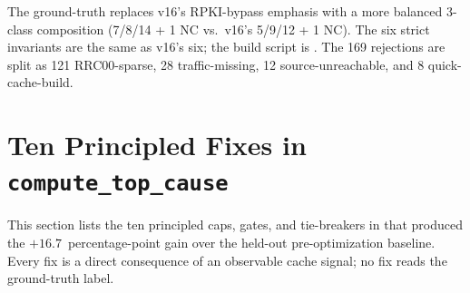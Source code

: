 \documentclass[sigcomm,nonatbib]{acmart}
\begin{document}
The ground-truth replaces v16's RPKI-bypass
emphasis with a more balanced 3-class composition
(7/8/14 + 1 NC vs.\ v16's 5/9/12 + 1 NC). The six
strict invariants are the same as v16's six; the
 build script is .
The 169 rejections are split as 121 RRC00-sparse,
28 traffic-missing, 12 source-unreachable, and
8 quick-cache-build.

\section{Ten Principled Fixes in \texttt{compute\_top\_cause}}
\label{sec:fixes}

This section lists the ten principled caps, gates, and
tie-breakers in
that produced the $+16.7$~percentage-point gain over the
held-out pre-optimization baseline. Every fix is a direct
consequence of an observable cache signal; no fix reads
the ground-truth label.
\end{document}
